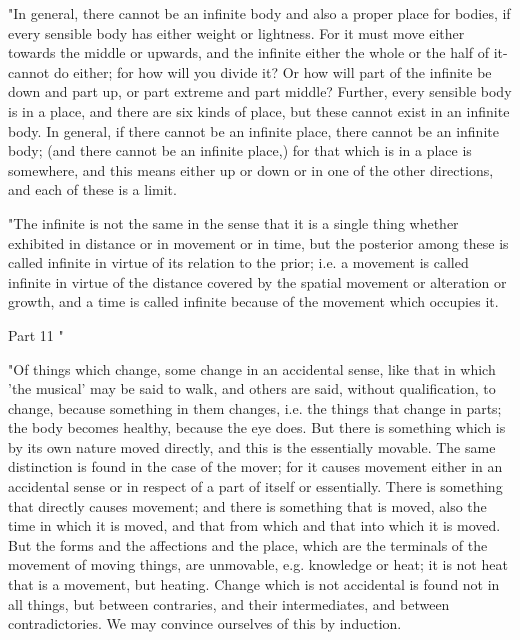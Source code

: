 "In general, there cannot be an infinite body and also a proper place
for bodies, if every sensible body has either weight or lightness.
For it must move either towards the middle or upwards, and the infinite
either the whole or the half of it-cannot do either; for how will
you divide it? Or how will part of the infinite be down and part up,
or part extreme and part middle? Further, every sensible body is in
a place, and there are six kinds of place, but these cannot exist
in an infinite body. In general, if there cannot be an infinite place,
there cannot be an infinite body; (and there cannot be an infinite
place,) for that which is in a place is somewhere, and this means
either up or down or in one of the other directions, and each of these
is a limit. 

"The infinite is not the same in the sense that it is a single thing
whether exhibited in distance or in movement or in time, but the posterior
among these is called infinite in virtue of its relation to the prior;
i.e. a movement is called infinite in virtue of the distance covered
by the spatial movement or alteration or growth, and a time is called
infinite because of the movement which occupies it. 

Part 11 "

"Of things which change, some change in an accidental sense, like
that in which 'the musical' may be said to walk, and others are said,
without qualification, to change, because something in them changes,
i.e. the things that change in parts; the body becomes healthy, because
the eye does. But there is something which is by its own nature moved
directly, and this is the essentially movable. The same distinction
is found in the case of the mover; for it causes movement either in
an accidental sense or in respect of a part of itself or essentially.
There is something that directly causes movement; and there is something
that is moved, also the time in which it is moved, and that from which
and that into which it is moved. But the forms and the affections
and the place, which are the terminals of the movement of moving things,
are unmovable, e.g. knowledge or heat; it is not heat that is a movement,
but heating. Change which is not accidental is found not in all things,
but between contraries, and their intermediates, and between contradictories.
We may convince ourselves of this by induction. 

